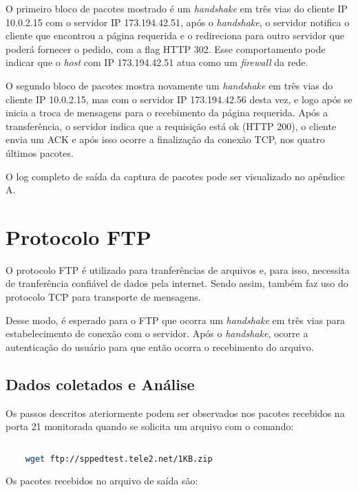 \documentclass[a4paper]{report} %
\begin{document}
	O primeiro bloco de pacotes mostrado é um \textit{handshake} em três vias do cliente IP 10.0.2.15 com o servidor IP 173.194.42.51, após o \textit{handshake}, o servidor notifica o cliente que encontrou a página requerida e o redireciona para outro servidor que poderá fornecer o pedido, com a flag HTTP 302. Esse comportamento pode indicar que o \textit{host} com IP 173.194.42.51 atua como um \textit{firewall} da rede.

	O segundo bloco de pacotes mostra novamente um \textit{handshake} em três vias do cliente IP 10.0.2.15, mas com o servidor IP 173.194.42.56 desta vez, e logo após se inicia a troca de mensagens para o recebimento da página requerida. Após a transferência, o servidor indica que a requisição está ok (HTTP 200), o cliente envia um ACK e após isso ocorre a finalização da conexão TCP, nos quatro últimos pacotes.

	O log completo de saída da captura de pacotes pode ser visualizado no apêndice A.

\section{Protocolo FTP}
\label{sec_ftp}

	O protocolo FTP é utilizado para tranferências de arquivos e, para isso, necessita de tranferência confiável de dados pela internet. Sendo assim, também faz uso do protocolo TCP para transporte de mensagens.

	Desse modo, é esperado para o FTP que ocorra um \textit{handshake} em três vias para estabelecimento de conexão com o servidor. Após o \textit{handshake}, ocorre a autenticação do usuário para que então ocorra o recebimento do arquivo.

\subsection{Dados coletados e Análise}
\label{sub_ftp_dados}
	Os passos descritos ateriormente podem ser observados nos pacotes recebidos na porta 21 monitorada quando se solicita um arquivo com o comando:

\begin{lstlisting}[language=bash]

	wget ftp://sppedtest.tele2.net/1KB.zip


\end{lstlisting}

	Os pacotes recebidos no arquivo de saída são:
\end{document}
